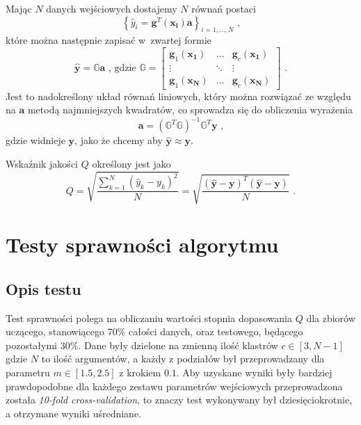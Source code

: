 \documentclass[a4paper; 11pt]{article}
\begin{document}
Mając $N$ danych wejściowych dostajemy $N$ równań postaci
\begin{equation}
    \left\{ \hat{y}_i = \mathbf{g}^T(\mathbf{x_i}) \mathbf{a} \right\} _ {i = 1, \dots , N} \text{ ,}
    \label{eq:ts:yhateqs}
\end{equation}
które można następnie zapisać w~zwartej formie
\begin{equation}
    \hat{\mathbf{y}} = \mathbb{G} \mathbf{a} \text{ , gdzie }
    \mathbb{G} = \begin{bmatrix}
        \mathbf{g}_1(\mathbf{x_1}) & \dots & \mathbf{g}_c(\mathbf{x_1}) \\
        \vdots & \ddots & \vdots \\
        \mathbf{g}_1(\mathbf{x_N}) & \dots & \mathbf{g}_c(\mathbf{x_N})
    \end{bmatrix} \text{ .}
    \label{eq:ts:yhatmatrix}
\end{equation}
Jest to nadokreślony układ równań liniowych, który można rozwiązać ze względu
na $\mathbf{a}$ metodą najmniejszych kwadratów, co sprowadza się do obliczenia
wyrażenia
\begin{equation}
    \mathbf{a} = \left( \mathbb{G}^T \mathbb{G} \right)^{-1} \mathbb{G}^T \mathbf{y} \text{ ,}
    \label{eq:ts:a}
\end{equation}
gdzie widnieje $\mathbf{y}$, jako że chcemy aby $\hat{\mathbf{y}} \approx \mathbf{y}$.

Wskaźnik jakości $Q$ określony jest jako
\begin{equation}
    Q = \sqrt{ \frac{ \sum\limits_{k=1}^N {\left( \hat{y}_k - y_k \right)^2} }{N} }
    = \sqrt { \frac{ (\hat{\mathbf{y}} - \mathbf{y})^T (\hat{\mathbf{y}} - \mathbf{y}) }{N} } \text{ .}
    \label{eq:ts:Q}
\end{equation}

\section{Testy sprawności algorytmu}

\subsection{Opis testu}
Test sprawności polega na obliczaniu wartości stopnia dopasowania $Q$ dla zbiorów uczącego,
stanowiącego 70\% całości danych, oraz testowego, będącego pozostałymi 30\%. Dane były dzielone
na zmienną ilość klastrów $c \in [3,N-1]$ gdzie $N$ to ilość argumentów, a każdy z podziałów
był przeprowadzany dla parametru $m \in [1.5, 2.5]$ z krokiem $0.1$. Aby uzyskane wyniki były
bardziej prawdopodobne dla każdego zestawu parametrów wejściowych przeprowadzona została
\emph{10-fold cross-validation}, to znaczy test wykonywany był dziesięciokrotnie, a otrzymane
wyniki uśredniane.
\end{document}
